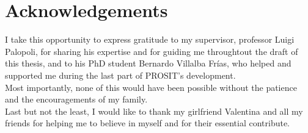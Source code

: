\chapter{Acknowledgements}\label{chp:acknowledgements}

I take this opportunity to express gratitude to my supervisor, professor Luigi Palopoli, for sharing his expertise and for guiding me throughtout the draft of this thesis, and to his PhD student Bernardo Villalba Frías, who helped and supported me during the last part of PROSIT's development.\\
Most importantly, none of this would have been possible without the patience and the encouragements of my family.\\
Last but not the least, I would like to thank my girlfriend Valentina and all my friends for helping me to believe in myself and for their essential contribute.